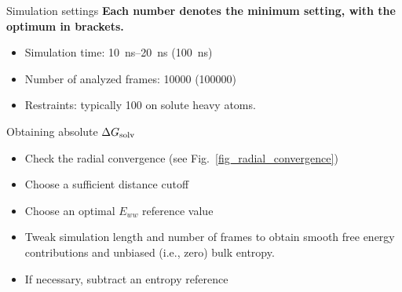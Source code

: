 \documentclass[9pt,tutorial]{livecoms}
\begin{document}
\begin{Checklists}[h]

\begin{checklist}{Simulation settings}
\textbf{Each number denotes the minimum setting, with the optimum in brackets.}
\begin{itemize}
	\item Simulation time: \SIrange{10}{20}{\nano\second} (\SI{100}{\nano\second})
	\item Number of analyzed frames: \num{10000} (\num{100000})
	\item Restraints: typically \SI{100}{\kcalPerMolASqr} on solute heavy atoms.
\end{itemize}
\end{checklist}

\begin{checklist}{Obtaining absolute $\Delta G_\textup{solv}$}
\begin{itemize}
	\item Check the radial convergence (see Fig.~\ref{fig_radial_convergence})
	\item Choose a sufficient distance cutoff
	\item Choose an optimal $E_{ww}$ reference value
	\item Tweak simulation length and number of frames to obtain smooth free energy contributions and unbiased (i.e., zero) bulk entropy.
	\item If necessary, subtract an entropy reference
\end{itemize}
\end{checklist}

%

\end{Checklists}
\end{document}
